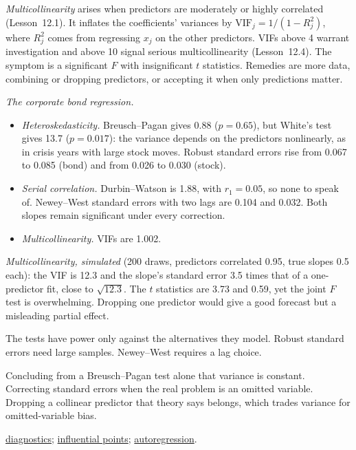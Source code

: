 \begin{qfmethod}
\emph{Multicollinearity} arises when predictors are moderately or highly correlated (Lesson~12.1). It inflates the coefficients' variances by $\mathrm{VIF}_j=1/(1-R_j^2)$, where $R_j^2$ comes from regressing $x_j$ on the other predictors. VIFs above 4 warrant investigation and above 10 signal serious multicollinearity (Lesson~12.4). The symptom is a significant $F$ with insignificant $t$ statistics. Remedies are more data, combining or dropping predictors, or accepting it when only predictions matter.

 \emph{The corporate bond regression.}
\begin{itemize}
\item \emph{Heteroskedasticity.} Breusch--Pagan gives 0.88 ($p=0.65$), but White's test gives 13.7 ($p=0.017$): the variance depends on the predictors nonlinearly, as in crisis years with large stock moves. Robust standard errors rise from 0.067 to 0.085 (bond) and from 0.026 to 0.030 (stock).
\item \emph{Serial correlation.} Durbin--Watson is 1.88, with $r_1=0.05$, so none to speak of. Newey--West standard errors with two lags are 0.104 and 0.032. Both slopes remain significant under every correction.
\item \emph{Multicollinearity.} VIFs are 1.002.
\end{itemize}
\emph{Multicollinearity, simulated} (200 draws, predictors correlated 0.95, true slopes 0.5 each): the VIF is 12.3 and the slope's standard error 3.5 times that of a one-predictor fit, close to $\sqrt{12.3}$. The $t$ statistics are 3.73 and 0.59, yet the joint $F$ test is overwhelming. Dropping one predictor would give a good forecast but a misleading partial effect.

 The tests have power only against the alternatives they model. Robust standard errors need large samples. Newey--West requires a lag choice.

 Concluding from a Breusch--Pagan test alone that variance is constant. Correcting standard errors when the real problem is an omitted variable. Dropping a collinear predictor that theory says belongs, which trades variance for omitted-variable bias.

 \hyperref[meth:regression-diagnostics-anova]{diagnostics}; \hyperref[meth:regression-extensions]{influential points}; \hyperref[meth:autoregressive-forecasting]{autoregression}.

\end{qfmethod}

